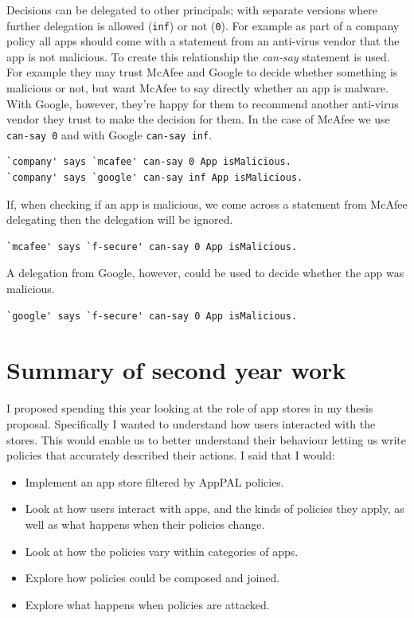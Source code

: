 \documentclass[a4paper]{scrartcl}
\begin{document}
Decisions can be delegated to other principals; with separate versions where further delegation is allowed (\lstinline{inf}) or not (\lstinline{0}).
For example as part of a company policy all apps should come with a statement from an anti-virus vendor that the app is not malicious.
To create this relationship the \emph{can-say} statement is used.
For example they may trust McAfee and Google to decide whether something is malicious or not, but want McAfee to say directly whether an app is malware.
With Google, however, they're happy for them to recommend another anti-virus vendor they trust to make the decision for them.
In the case of McAfee we use \lstinline{can-say 0} and with Google \lstinline{can-say inf}.
\begin{lstlisting}
`company' says `mcafee' can-say 0 App isMalicious.
`company' says `google' can-say inf App isMalicious.
\end{lstlisting}
If, when checking if an app is malicious, we come across a statement from McAfee delegating then the delegation will be ignored.
\begin{lstlisting}
`mcafee' says `f-secure' can-say 0 App isMalicious.
\end{lstlisting}
A delegation from Google, however, could be used to decide whether the app was malicious.
\begin{lstlisting}
`google' says `f-secure' can-say 0 App isMalicious.
\end{lstlisting}

\section{Summary of second year work}


I proposed spending this year looking at the role of app stores in my thesis proposal.
Specifically I wanted to understand how users interacted with the stores.
This would enable us to better understand their behaviour letting us write policies that accurately described their actions.
I said that I would:
\begin{itemize}
  \item Implement an app store filtered by AppPAL policies.
  \item Look at how users interact with apps, and the kinds of policies they apply, as well as what happens when their policies change.
  \item Look at how the policies vary within categories of apps.
  \item Explore how policies could be composed and joined.
  \item Explore what happens when policies are attacked.
\end{itemize}
\end{document}
